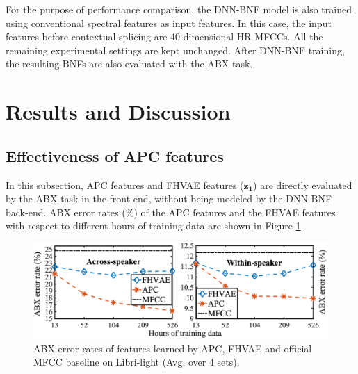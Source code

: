 \documentclass[a4paper]{article}
\begin{document}



For the purpose of performance comparison, the DNN-BNF model is also trained using conventional spectral features as input features. 
In this case, the %
input features before contextual splicing are $40$-dimensional HR MFCCs. All the remaining experimental settings   are kept unchanged.
After DNN-BNF training, the resulting BNFs are also evaluated with the ABX task.

\section{Results and Discussion}
\subsection{Effectiveness of APC features }
\label{subsec:results_apc}

In this subsection, APC  features and FHVAE features ($\bm{z_1}$)  are directly evaluated by the ABX task in the front-end, without being modeled by the  DNN-BNF back-end. %
ABX error rates ($\%$) of the APC  features  and the FHVAE features with respect to different hours of training data  are shown in Figure \ref{fig:apc_fhvae_mfcc}.

\begin{figure}[!t]
    \centering
    \includegraphics[width=1\linewidth]{LaTeX/apc_fhvae_mfcc_no_sub_hori_no_hrs.png}
    \caption{ABX error rates  of features learned by APC, FHVAE and official MFCC baseline on Libri-light (Avg. over $4$ sets). }
    \label{fig:apc_fhvae_mfcc}
\end{figure}
\end{document}
